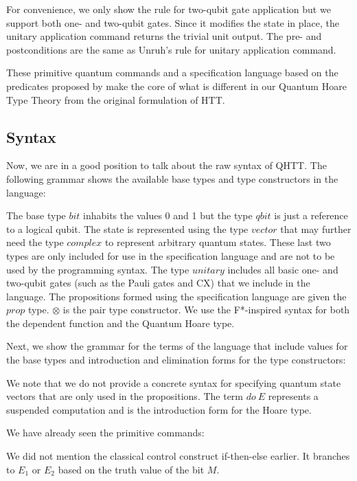 For convenience, we only show the rule for two-qubit gate application but we support both one- and two-qubit gates. Since it modifies the state in place, the unitary application command returns the trivial unit output. The pre- and postconditions are the same as Unruh's rule for unitary application command.

These primitive quantum commands and a specification language based on the predicates proposed by \textcite{unruh2019} make the core of what is different in our Quantum Hoare Type Theory from the original formulation of HTT.

\subsection{Syntax}

Now, we are in a good position to talk about the raw syntax of QHTT. The following grammar shows the available base types and type constructors in the language:


The base type $bit$ inhabits the values 0 and 1 but the type $qbit$ is just a reference to a logical qubit. The state is represented using the type $vector$ that may further need the type $complex$ to represent arbitrary quantum states. These last two types are only included for use in the specification language and are not to be used by the programming syntax. The type $unitary$ includes all basic one- and two-qubit gates (such as the Pauli gates and CX) that we include in the language. The propositions formed using the specification language are given the $prop$ type. $\otimes$ is the pair type constructor. We use the F*-inspired syntax for both the dependent function and the Quantum Hoare type.

Next, we show the grammar for the terms of the language that include values for the base types and introduction and elimination forms for the type constructors:


We note that we do not provide a concrete syntax for specifying quantum state vectors that are only used in the propositions. The term $do\ E$ represents a suspended computation and is the introduction form for the Hoare type.

We have already seen the primitive commands:


We did not mention the classical control construct if-then-else earlier. It branches to $E_1$ or $E_2$ based on the truth value of the bit $M$.

